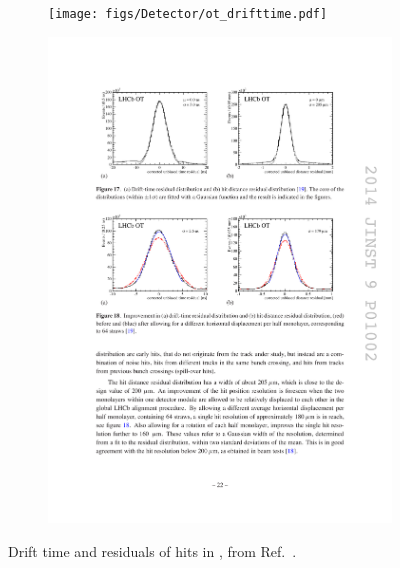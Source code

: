 \begin{figure}[!h]
    \centering
    \begin{subfigure}[t]{0.4\textwidth}
        \centering
        \texttt{[image: figs/Detector/ot\_drifttime.pdf]}
    \end{subfigure}
    \begin{subfigure}[t]{0.4\textwidth}
        \centering
        \includegraphics[width=1.0\textwidth]{figs/Detector/ot_residuals.pdf}
    \end{subfigure}
    \caption{Drift time and residuals of hits in \ot, from Ref.~\cite{LHCb-DP-2013-003}.}
    \label{fig:Dec_magnet}   
\end{figure}






